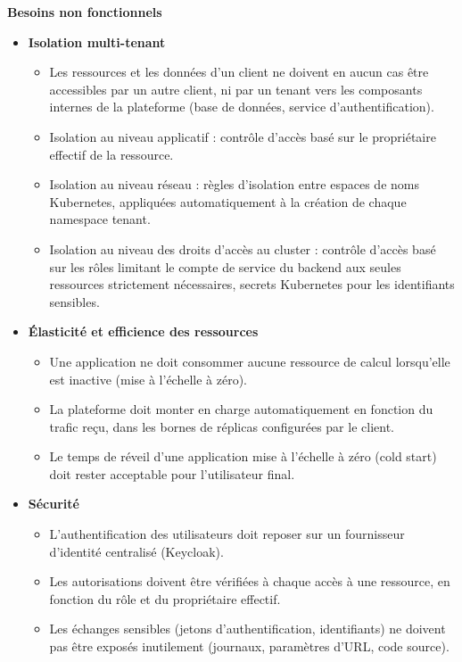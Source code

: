 \medskip
\textbf{Besoins non fonctionnels}
\medskip

\begin{itemize}
    \item \textbf{Isolation multi-tenant}
    \begin{itemize}[label=--]
        \item Les ressources et les données d'un client ne doivent en aucun cas être accessibles par un autre client, ni par un tenant vers les composants internes de la plateforme (base de données, service d'authentification).
        \item Isolation au niveau applicatif : contrôle d'accès basé sur le propriétaire effectif de la ressource.
        \item Isolation au niveau réseau : règles d'isolation entre espaces de noms Kubernetes, appliquées automatiquement à la création de chaque namespace tenant.
        \item Isolation au niveau des droits d'accès au cluster : contrôle d'accès basé sur les rôles limitant le compte de service du backend aux seules ressources strictement nécessaires, secrets Kubernetes pour les identifiants sensibles.
    \end{itemize}

    \item \textbf{Élasticité et efficience des ressources}
    \begin{itemize}[label=--]
        \item Une application ne doit consommer aucune ressource de calcul lorsqu'elle est inactive (mise à l'échelle à zéro).
        \item La plateforme doit monter en charge automatiquement en fonction du trafic reçu, dans les bornes de réplicas configurées par le client.
        \item Le temps de réveil d'une application mise à l'échelle à zéro (cold start) doit rester acceptable pour l'utilisateur final.
    \end{itemize}

    \item \textbf{Sécurité}
    \begin{itemize}[label=--]
        \item L'authentification des utilisateurs doit reposer sur un fournisseur d'identité centralisé (Keycloak).
        \item Les autorisations doivent être vérifiées à chaque accès à une ressource, en fonction du rôle et du propriétaire effectif.
        \item Les échanges sensibles (jetons d'authentification, identifiants) ne doivent pas être exposés inutilement (journaux, paramètres d'URL, code source).
    \end{itemize}


\end{itemize}

